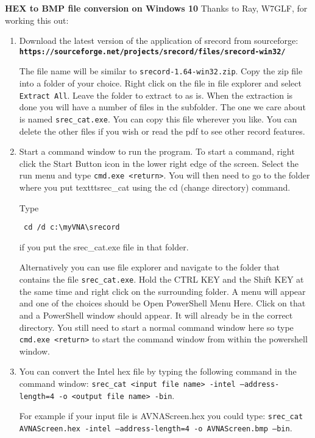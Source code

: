 \begin{description}
\textbf{HEX to BMP file conversion on Windows 10}  Thanks to Ray, W7GLF, for working this out:
\begin{enumerate}
 \item Download the latest version of the application of srecord from sourceforge:
\linebreak
\textbf{\texttt{https://sourceforge.net/projects/srecord/files/srecord-win32/}}
\linebreak

The file name will be similar to \texttt{srecord-1.64-win32.zip}.  Copy the zip file into a folder of your choice.  Right click on the file in file explorer and select \texttt{Extract All}.  Leave the folder to extract to as is.  When the extraction is done you will have a number of files in the subfolder.  The one we care about is named \texttt{srec\_cat.exe}.  You can copy this file wherever you like.  You can delete the other files if you wish or read the pdf to see other record features.

\item Start a command window to run the program.  To start a command, right click the Start Button icon in the lower right edge of the screen.  Select the run menu and type \texttt{cmd.exe <return>}.  You will then need to go to the folder where you put texttt{srec\_cat} using the cd (change directory) command. 

Type \begin{verbatim} cd /d c:\myVNA\srecord\end{verbatim} if you put the srec\_cat.exe file in that folder.

Alternatively you can use file explorer and navigate to the folder that contains the file \texttt{srec\_cat.exe}.  Hold the CTRL KEY and the Shift KEY at the same time and right click on the surrounding folder.  A menu will appear and one of the choices should be Open PowerShell Menu Here.  Click on that and a PowerShell window should appear.  It will already be in the correct directory.  You still need to start a normal command window here so type \texttt{cmd.exe <return>} to start the command window from within the powershell window.  

\item You can convert the Intel hex file by typing the following command in the command window:  \texttt{srec\_cat  <input file name> -intel --address-length=4 -o <output file name>  -bin}.

For example if your input file is AVNAScreen.hex you could type: \texttt{srec\_cat  AVNAScreen.hex -intel --address-length=4 -o AVNAScreen.bmp –bin}.
\end{enumerate}
\end{description}

